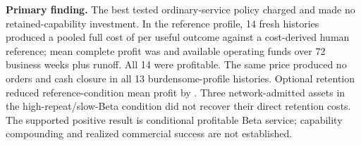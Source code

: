 \par\textbf{Primary finding.} The best tested ordinary-service policy charged  and made no retained-capability investment. In the reference profile, 14 fresh histories produced a pooled full cost of  per useful outcome against a  cost-derived human reference; mean complete profit was  and available operating funds  over 72 business weeks plus runoff. All 14 were profitable. The same price produced no orders and cash closure in all 13 burdensome-profile histories. Optional retention reduced reference-condition mean profit by . Three network-admitted assets in the high-repeat/slow-Beta condition did not recover their direct retention costs. The supported positive result is conditional profitable Beta service; capability compounding and realized commercial success are not established.
